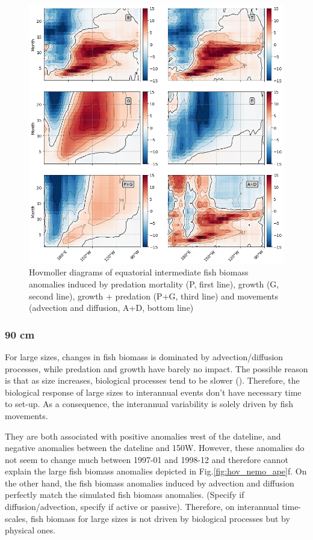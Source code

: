 \begin{figure}[htp]
	\centering
	\includegraphics[scale=0.4]{figs/hov_compo_l_20.png}	
	\caption{Hovmoller diagrams of equatorial intermediate fish biomass anomalies induced by predation mortality (P, first line), growth (G, second line), growth + predation (P+G, third line) and movements (advection and diffusion, A+D, bottom line)}	
	\label{fig:hov_ape_trends_20}
\end{figure}

\subsubsection{90 cm}

For large sizes, changes in fish biomass is dominated by advection/diffusion processes, while predation and growth have barely no impact. The possible reason is that as size increases, biological processes tend to be slower (). Therefore, the biological response of large sizes to interannual events don't have necessary time to set-up. As a consequence, the interannual variability is solely driven by fish movements.



They are both associated with positive anomalies west of the dateline, and negative anomalies between the dateline and 150W. However, these anomalies do not seem to change much between 1997-01 and 1998-12 and therefore cannot explain the large fish biomass anomalies depicted in Fig.\ref{fig:hov_nemo_ape}f. On the other hand, the fish biomass anomalies induced by advection and diffusion perfectly match the simulated fish biomass anomalies. \warn(Specify if diffusion/advection, specify if active or passive). Therefore, on interannual time-scales, fish biomass for large sizes is not driven by biological processes but by physical ones.

